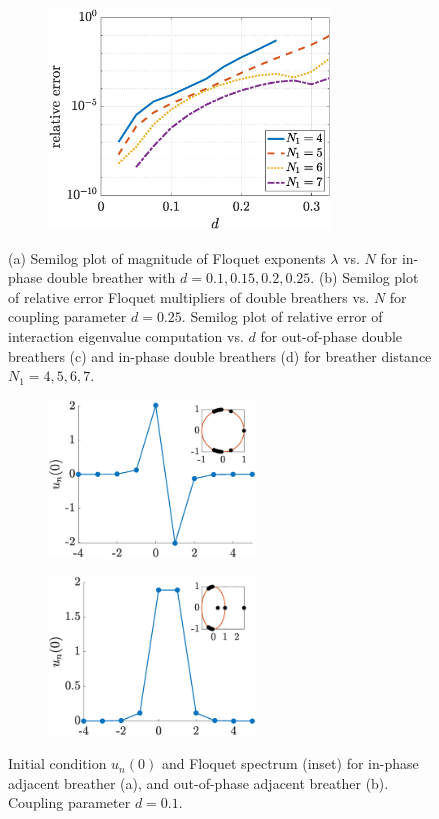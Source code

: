 \documentclass[12pt,reqno]{amsart}
\theoremstyle{definition}
\begin{document}
\begin{figure}
\begin{center}
\begin{subfigure}{0.45\linewidth}
		\caption{}
		\includegraphics[width=7.5cm]{doubleppeigerrord.eps} \hspace{-0.5cm}
		\label{fig:eigerrord} 
	\end{subfigure}
	\end{center}
	\caption{(a) Semilog plot of magnitude of Floquet exponents $\lambda$ vs. $N$ for in-phase double breather with $d = 0.1, 0.15, 0.2, 0.25$. (b) Semilog plot of relative error Floquet multipliers of double breathers vs. $N$ for coupling parameter $d = 0.25$.
	Semilog plot of relative error of interaction eigenvalue computation vs. $d$ for out-of-phase double breathers (c) and in-phase double breathers (d) for breather distance $N_1 = 4,5,6,7$. }
	\label{fig:eigerror}
\end{figure}

\begin{figure}
	\begin{center}
	\begin{subfigure}{0.3\linewidth}
		\caption{}
		\includegraphics[width=5.5cm]{SGintersitepm.eps} \hspace{-0.5cm}
		\label{fig:SGintersitea} 
	\end{subfigure}
	\begin{subfigure}{0.3\linewidth}
		\caption{}
		\includegraphics[width=5.5cm]{SGintersitepp.eps} \hspace{-0.5cm}
		\label{fig:SGintersiteb} 
	\end{subfigure}
	\end{center}
	\caption{Initial condition $u_n(0)$ and Floquet spectrum (inset) for in-phase adjacent breather (a), and out-of-phase adjacent breather (b). Coupling parameter $d=0.1$. }
	\label{fig:SGintersite}
\end{figure}
\end{document}
